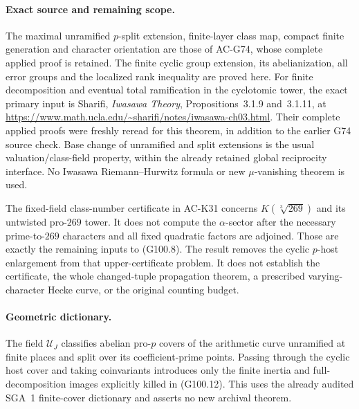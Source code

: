\paragraph{Exact source and remaining scope.}
The maximal unramified $p$-split extension, finite-layer class map,
compact finite generation and character orientation are those of
AC-G74, whose complete applied proof is retained.  The finite
cyclic group extension, its abelianization, all error groups and
the localized rank inequality are proved here.
For finite decomposition and eventual total ramification in the
cyclotomic tower, the exact primary input is Sharifi,
\emph{Iwasawa Theory}, Propositions~3.1.9 and~3.1.11, at
\url{https://www.math.ucla.edu/~sharifi/notes/iwasawa-ch03.html}.
Their complete applied proofs were freshly reread for this theorem,
in addition to the earlier G74 source check.  Base change
of unramified and split extensions is the usual valuation/class-field
property, within the already retained global reciprocity interface.
No Iwasawa Riemann--Hurwitz formula or new $\mu$-vanishing theorem
is used.

The fixed-field class-number certificate in AC-K31 concerns
$K(\sqrt[3]{269})$ and its untwisted pro-$269$ tower.
It does not compute the $\alpha$-sector after the necessary
prime-to-$269$ characters and all fixed quadratic factors are
adjoined.  Those are exactly the remaining inputs to (G100.8).
The result removes the cyclic $p$-host enlargement from that
upper-certificate problem.  It does not establish the certificate,
the whole changed-tuple propagation theorem, a prescribed
varying-character Hecke curve, or the original counting budget.

\paragraph{Geometric dictionary.}
The field $\mathcal U_J$ classifies abelian pro-$p$ covers of the
arithmetic curve unramified at finite places and split over its
coefficient-prime points.  Passing through the cyclic host cover
and taking coinvariants introduces only the finite inertia and
full-decomposition images explicitly killed in (G100.12).
This uses the already audited SGA~1 finite-cover dictionary and
asserts no new archival theorem.
